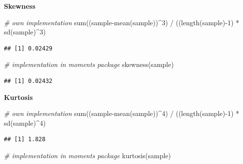 \documentclass[
  12pt,
]{style/krantz}
\newenvironment{Shaded}{\begin{snugshade}}{\end{snugshade}}
\newcommand{\CommentTok}[1]{\textcolor[rgb]{0.56,0.35,0.01}{\textit{#1}}}
\newcommand{\DecValTok}[1]{\textcolor[rgb]{0.00,0.00,0.81}{#1}}
\newcommand{\FunctionTok}[1]{\textcolor[rgb]{0.00,0.00,0.00}{#1}}
\newcommand{\NormalTok}[1]{#1}
\newcommand{\SpecialCharTok}[1]{\textcolor[rgb]{0.00,0.00,0.00}{#1}}
\begin{document}
\textbf{Skewness}

\begin{Shaded}
\begin{Highlighting}[]
\CommentTok{\# own implementation}
\FunctionTok{sum}\NormalTok{((sample}\SpecialCharTok{{-}}\FunctionTok{mean}\NormalTok{(sample))}\SpecialCharTok{\^{}}\DecValTok{3}\NormalTok{) }\SpecialCharTok{/}\NormalTok{ ((}\FunctionTok{length}\NormalTok{(sample)}\SpecialCharTok{{-}}\DecValTok{1}\NormalTok{) }\SpecialCharTok{*} \FunctionTok{sd}\NormalTok{(sample)}\SpecialCharTok{\^{}}\DecValTok{3}\NormalTok{)}
\end{Highlighting}
\end{Shaded}

\begin{verbatim}
## [1] 0.02429
\end{verbatim}

\begin{Shaded}
\begin{Highlighting}[]
\CommentTok{\# implementation in moments package}
\FunctionTok{skewness}\NormalTok{(sample)}
\end{Highlighting}
\end{Shaded}

\begin{verbatim}
## [1] 0.02432
\end{verbatim}

\textbf{Kurtosis}

\begin{Shaded}
\begin{Highlighting}[]
\CommentTok{\# own implementation}
\FunctionTok{sum}\NormalTok{((sample}\SpecialCharTok{{-}}\FunctionTok{mean}\NormalTok{(sample))}\SpecialCharTok{\^{}}\DecValTok{4}\NormalTok{) }\SpecialCharTok{/}\NormalTok{ ((}\FunctionTok{length}\NormalTok{(sample)}\SpecialCharTok{{-}}\DecValTok{1}\NormalTok{) }\SpecialCharTok{*} \FunctionTok{sd}\NormalTok{(sample)}\SpecialCharTok{\^{}}\DecValTok{4}\NormalTok{)}
\end{Highlighting}
\end{Shaded}

\begin{verbatim}
## [1] 1.828
\end{verbatim}

\begin{Shaded}
\begin{Highlighting}[]
\CommentTok{\# implementation in moments package}
\FunctionTok{kurtosis}\NormalTok{(sample)}
\end{Highlighting}
\end{Shaded}
\end{document}
